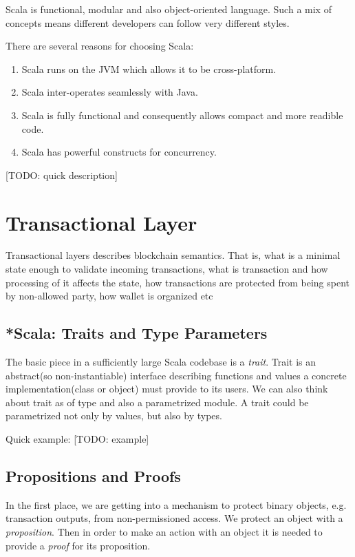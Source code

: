 \documentclass[]{report}   %
\begin{document}
Scala is functional, modular and also object-oriented language. Such a mix of concepts means different developers can follow very different styles. 

There are several reasons for choosing Scala:
\begin{enumerate}
	\item Scala runs on the JVM which allows it to be cross-platform.
	\item Scala inter-operates seamlessly with Java.
	\item Scala is fully functional and consequently allows compact and more readible code.
	\item Scala has powerful constructs for concurrency.
	
\end{enumerate}

[TODO: quick description]

\section{Transactional Layer}

Transactional layers describes blockchain semantics. That is, what is a minimal state enough to validate incoming transactions, what is transaction and how processing of it affects the state, how transactions are protected from being spent by non-allowed party, how wallet is organized etc

\subsection{*Scala: Traits and Type Parameters}

The basic piece in a sufficiently large Scala codebase is a \textit{trait}. Trait is an abstract(so non-instantiable) interface describing functions and values a concrete implementation(class or object) must provide to its users. We can also think about trait as of type and also a parametrized module. A trait could be parametrized not only by values, but also by types. 

Quick example: 
[TODO: example]

\subsection{Propositions and Proofs}

In the first place, we are getting into a mechanism to protect binary objects, e.g. transaction outputs, from non-permissioned access. We protect an object with a \textit{proposition}. Then in order to make an action with an object it is needed to provide a \textit{proof} for its proposition. 
\end{document}

